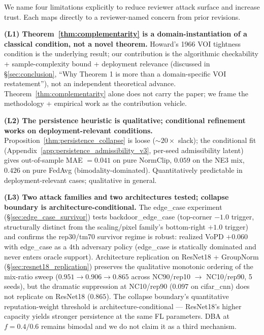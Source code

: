 \documentclass{article}
\begin{document}
We name four limitations explicitly to reduce reviewer attack surface and increase trust. Each maps directly to a reviewer-named concern from prior revisions.

\textbf{(L1) Theorem~\ref{thm:complementarity} is a domain-instantiation of a classical condition, not a novel theorem.} Howard's 1966 VOI tightness condition is the underlying result; our contribution is the algorithmic checkability + sample-complexity bound + deployment relevance (discussed in §\ref{sec:conclusion}, ``Why Theorem 1 is more than a domain-specific VOI restatement''), not an independent theoretical advance. Theorem~\ref{thm:complementarity} alone does not carry the paper; we frame the methodology + empirical work as the contribution vehicle.

\textbf{(L2) The persistence heuristic is qualitative; conditional refinement works on deployment-relevant conditions.} Proposition~\ref{thm:persistence_collapse} is loose ($\sim 20\times$ slack); the conditional fit (Appendix~\ref{app:persistence_admissibility_v3}, per-seed admissibility latent) gives out-of-sample MAE $= 0.041$ on pure NormClip, $0.059$ on the NE3 mix, $0.426$ on pure FedAvg (bimodality-dominated). Quantitatively predictable in deployment-relevant cases; qualitative in general.

\textbf{(L3) Two attack families and two architectures tested; collapse boundary is architecture-conditional.} The edge\_case experiment (§\ref{sec:edge_case_survivor}) tests backdoor\_edge\_case (top-corner $-1.0$ trigger, structurally distinct from the scaling/pixel family's bottom-right $+1.0$ trigger) and confirms the rep30/tm70 survivor regime is robust: realized VoPD $+0.060$ with edge\_case as a 4th adversary policy (edge\_case is statically dominated and never enters oracle support). Architecture replication on ResNet18 + GroupNorm (§\ref{sec:resnet18_replication}) preserves the qualitative monotonic ordering of the mix-ratio sweep ($0.951 \to 0.906 \to 0.865$ across NC90/rep10 $\to$ NC10/rep90, 5 seeds), but the dramatic suppression at NC10/rep90 ($0.097$ on cifar\_cnn) does not replicate on ResNet18 ($0.865$). The collapse boundary's quantitative reputation-weight threshold is architecture-conditional --- ResNet18's higher capacity yields stronger persistence at the same FL parameters. DBA at $f{=}0.4/0.6$ remains bimodal and we do not claim it as a third mechanism.
\end{document}
